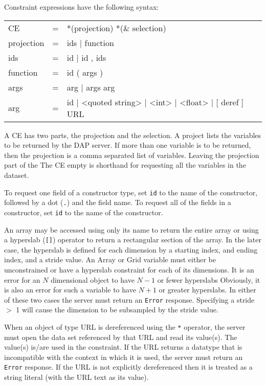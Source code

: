 \documentclass{article}
\begin{document}
Constraint expressions have the following syntax:

\begin{ttfamily}
\begin{center}
\begin{tabular}{lll}
CE & = & *(projection) *(\& selection) \\
projection & = & ids | function \\
ids & = & id | id , ids \\
function & = & id ( args ) \\
args & = & arg | args arg \\
arg & = & id | <quoted string> | <int> | <float> | [ deref ] URL \\
\end{tabular}
\end{center}
\end{ttfamily}

A \ac{CE} has two parts, the projection and the selection. A project lists the
variables to be returned by the \ac{DAP} server. If more than one variable is
to be returned, then the projection is a comma separated list of variables.
Leaving the projection part of the The \ac{CE} empty is shorthand for
requesting all the variables in the dataset.

To request one field of a constructor type, set \texttt{id} to the name of
the constructor, followed by a dot (\texttt{.}) and the field name. To
request all of the fields in a constructor, set \texttt{id} to the name of
the constructor.

An array may be accessed using only its name to return the entire array or
using a hyperslab (\texttt{[]}) operator to return a rectangular section of
the array. In the later case, the hyperslab is defined for each dimension by
a starting index, and ending index, and a stride value. \cbstart An Array or
Grid variable must either be unconstrained or have a hyperslab constraint for
each of its dimensions. It is an error for an $N$ dimensional object to have
$N-1$ or fewer hyperslabs Obviously, it is also an error for such a variable
to have $N+1$ or greater hyperslabs. In either of these two cases the server
must return an \texttt{Error} response. \cbend Specifying a stride $>$ 1 will
cause the dimension to be subsampled by the stride value.

When an object of type URL is dereferenced using the \texttt{*} operator, the
server must open the data set referenced by that URL and read its value(s).
The value(s) is/are used in the constraint. If the URL returns a datatype
that is incompatible with the context in which it is used, the server must
return an \texttt{Error} response. If the URL is not explicitly dereferenced
then it is treated as a string literal (with the URL text as its value).
\end{document}
